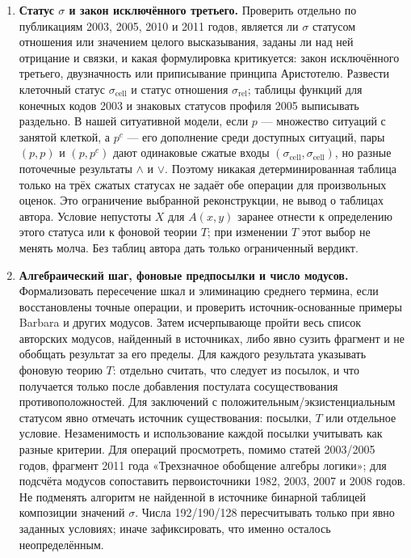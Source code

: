 \documentclass[12pt,a4paper]{article}
\begin{document}
\begin{enumerate}
\item \textbf{Статус \(\sigma\) и закон исключённого третьего.} Проверить отдельно по публикациям 2003, 2005, 2010 и 2011 годов, является ли \(\sigma\) статусом отношения или значением целого высказывания, заданы ли над ней отрицание и связки, и какая формулировка критикуется: закон исключённого третьего, двузначность или приписывание принципа Аристотелю. Развести клеточный статус \(\sigma_{\mathrm{cell}}\) и статус отношения \(\sigma_{\mathrm{rel}}\); таблицы функций для конечных кодов 2003 и знаковых статусов профиля 2005 выписывать раздельно. В нашей ситуативной модели, если \(p\) — множество ситуаций с занятой клеткой, а \(p^c\) — его дополнение среди доступных ситуаций, пары \((p,p)\) и \((p,p^c)\) дают одинаковые сжатые входы \((\sigma_{\mathrm{cell}},\sigma_{\mathrm{cell}})\), но разные поточечные результаты \(\land\) и \(\lor\). Поэтому никакая детерминированная таблица только на трёх сжатых статусах не задаёт обе операции для произвольных оценок. Это ограничение выбранной реконструкции, не вывод о таблицах автора. Условие непустоты \(X\) для \(A(x,y)\) заранее отнести к определению этого статуса или к фоновой теории \(T\); при изменении \(T\) этот выбор не менять молча. Без таблиц автора дать только ограниченный вердикт.
\item \textbf{Алгебраический шаг, фоновые предпосылки и число модусов.} Формализовать пересечение шкал и элиминацию среднего термина, если восстановлены точные операции, и проверить источник-основанные примеры Barbara и других модусов. Затем исчерпывающе пройти весь список авторских модусов, найденный в источниках, либо явно сузить фрагмент и не обобщать результат за его пределы. Для каждого результата указывать фоновую теорию \(T\): отдельно считать, что следует из посылок, и что получается только после добавления постулата сосуществования противоположностей. Для заключений с положительным/экзистенциальным статусом явно отмечать источник существования: посылки, \(T\) или отдельное условие. Незаменимость и использование каждой посылки учитывать как разные критерии. Для операций просмотреть, помимо статей 2003/2005 годов, фрагмент 2011 года «Трехзначное обобщение алгебры логики»; для подсчёта модусов сопоставить первоисточники 1982, 2003, 2007 и 2008 годов. Не подменять алгоритм не найденной в источнике бинарной таблицей композиции значений \(\sigma\). Числа 192/190/128 пересчитывать только при явно заданных условиях; иначе зафиксировать, что именно осталось неопределённым.

\end{enumerate}
\end{document}
